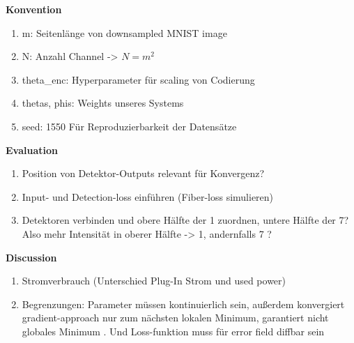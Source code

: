 \textbf{Konvention}
\begin{enumerate}
    \item m: Seitenlänge von downsampled MNIST image
    \item N: Anzahl Channel -> $N=m^2$
    \item theta\_enc: Hyperparameter für scaling von Codierung
    \item thetas, phis: Weights unseres Systems
    \item seed: 1550 Für Reproduzierbarkeit der Datensätze
    
\end{enumerate}

\textbf{Evaluation}
\begin{enumerate}
    \item Position von Detektor-Outputs relevant für Konvergenz?
    \item Input- und Detection-loss einführen (Fiber-loss simulieren)
    \item Detektoren verbinden und obere Hälfte der 1 zuordnen, untere Hälfte der 7? Also mehr Intensität in oberer Hälfte -> 1, andernfalls 7 ?
\end{enumerate}

\textbf{Discussion}
\begin{enumerate}
    \item Stromverbrauch (Unterschied Plug-In Strom und used power)
    \item Begrenzungen: Parameter müssen kontinuierlich sein, außerdem konvergiert gradient-approach nur zum nächsten lokalen Minimum, garantiert nicht globales Minimum \cite{gilesIntroductionAdjointApproach2000}.
    Und Loss-funktion muss für error field diffbar sein
\end{enumerate}
